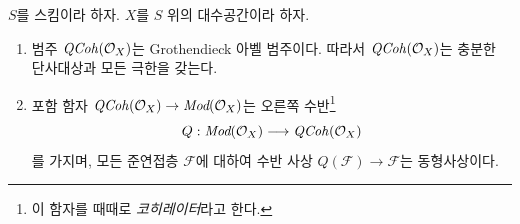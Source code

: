 \begin{proposition}
\label{proposition-coherator}
$S$를 스킴이라 하자. $X$를 $S$ 위의 대수공간이라 하자.
\begin{enumerate}
\item 범주 $\mathit{QCoh}(\mathcal{O}_X)$는 Grothendieck 아벨 범주이다.
따라서 $\mathit{QCoh}(\mathcal{O}_X)$는 충분한 단사대상과 모든 극한을 갖는다.
\item 포함 함자
$\mathit{QCoh}(\mathcal{O}_X) \to \textit{Mod}(\mathcal{O}_X)$는 오른쪽
수반\footnote{이 함자를 때때로 {\it 코히레이터}라고 한다.}
$$
Q : \textit{Mod}(\mathcal{O}_X) \longrightarrow \mathit{QCoh}(\mathcal{O}_X)
$$
를 가지며, 모든 준연접층 $\mathcal{F}$에 대하여 수반 사상
$Q(\mathcal{F}) \to \mathcal{F}$는 동형사상이다.
\end{enumerate}
\end{proposition}

